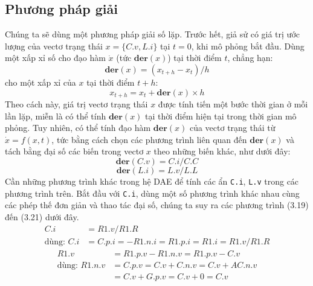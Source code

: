 \subsection{Phương pháp giải}
Chúng ta sẽ dùng một phương pháp giải số lặp. Trước hết, giả sử có giá trị ước lượng của vectơ trạng thái $x=\{C.v,L.i\}$ tại $t=0$, khi mô phỏng bắt đầu. Dùng một xấp xỉ số cho đạo hàm $\dot{x}$ (tức $\mathbf{der}(x)$) tại thời điểm $t$, chẳng hạn:
\begin{equation}\mathbf{der}(x)=(x_{t+h}-x_t)/h\tag{3.15}\end{equation}
cho một xấp xỉ của $x$ tại thời điểm $t+h$:
\begin{equation}x_{t+h}=x_t+\mathbf{der}(x)\times h\tag{3.16}\end{equation}
Theo cách này, giá trị vectơ trạng thái $x$ được tính tiến một bước thời gian ở mỗi lần lặp, miễn là có thể tính $\mathbf{der}(x)$ tại thời điểm hiện tại trong thời gian mô phỏng. Tuy nhiên, có thể tính đạo hàm $\mathbf{der}(x)$ của vectơ trạng thái từ $\dot{x}=f(x,t)$, tức bằng cách chọn các phương trình liên quan đến $\mathbf{der}(x)$ và tách bằng đại số các biến trong vectơ $x$ theo những biến khác, như dưới đây:
\begin{equation}\mathbf{der}(C.v)=C.i/C.C\tag{3.17}\end{equation}
\begin{equation}\mathbf{der}(L.i)=L.v/L.L\tag{3.18}\end{equation}
Cần những phương trình khác trong hệ DAE để tính các ẩn \texttt{C.i}, \texttt{L.v} trong các phương trình trên. Bắt đầu với \texttt{C.i}, dùng một số phương trình khác nhau cùng các phép thế đơn giản và thao tác đại số, chúng ta suy ra các phương trình (3.19) đến (3.21) dưới đây.
\begin{equation}
\begin{aligned}
C.i&=R1.v/R1.R\\
\text{dùng: }C.i&=C.p.i=-R1.n.i=R1.p.i=R1.i=R1.v/R1.R
\end{aligned}\tag{3.19}
\end{equation}
\begin{equation}
\begin{aligned}
R1.v&=R1.p.v-R1.n.v=R1.p.v-C.v\\
\text{dùng: }R1.n.v&=C.p.v=C.v+C.n.v=C.v+AC.n.v\\
&=C.v+G.p.v=C.v+0=C.v
\end{aligned}\tag{3.20}
\end{equation}

